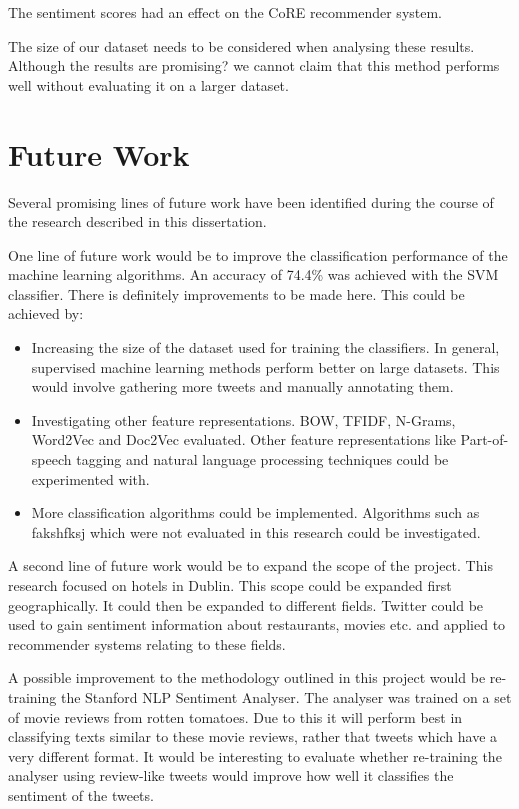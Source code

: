 The sentiment scores had an effect on the CoRE recommender system.

The size of our dataset needs to be considered when analysing these results. Although the results are promising? we cannot claim that this method performs well without evaluating it on a larger dataset. 


\section{Future Work}

Several promising lines of future work have been identified during the course of the research described in this dissertation.

One line of future work would be to improve the classification performance of the machine learning algorithms. An accuracy of 74.4\% was achieved with the SVM classifier. There is definitely improvements to be made here. This could be achieved by:
\begin{itemize}
    \item Increasing the size of the dataset used for training the classifiers. In general, supervised machine learning methods perform better on large datasets. This would involve gathering more tweets and manually annotating them.
    \item Investigating other feature representations. BOW, TFIDF, N-Grams, Word2Vec and Doc2Vec evaluated. Other feature representations like Part-of-speech tagging and natural language processing techniques could be experimented with.
    \item More classification algorithms could be implemented. Algorithms such as fakshfksj which were not evaluated in this research could be investigated. 
\end{itemize}

A second line of future work would be to expand the scope of the project. This research focused on hotels in Dublin. This scope could be expanded first geographically. It could then be expanded to different fields. Twitter could be used to gain sentiment information about restaurants, movies etc. and applied to recommender systems relating to these fields.

A possible improvement to the methodology outlined in this project would be re-training the Stanford NLP Sentiment Analyser. The analyser was trained on a set of movie reviews from rotten tomatoes. Due to this it will perform best in classifying texts similar to these movie reviews, rather that tweets which have a very different format. It would be interesting to evaluate whether re-training the analyser using review-like tweets would improve how well it classifies the sentiment of the tweets. 

